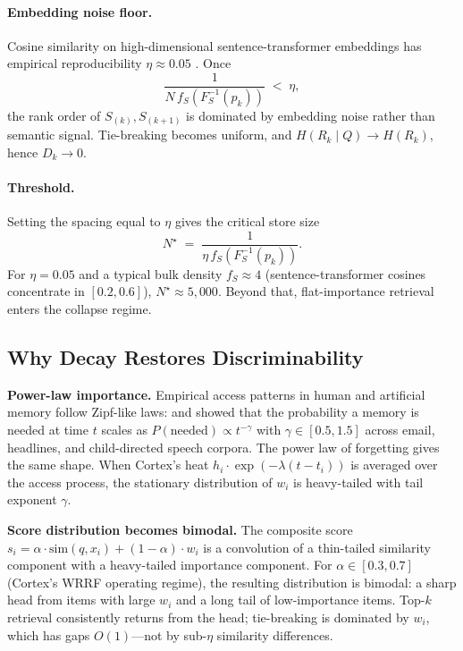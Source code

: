 \documentclass[11pt]{article}
\begin{document}
\paragraph{Embedding noise floor.}
Cosine similarity on high-dimensional sentence-transformer
embeddings has empirical reproducibility $\eta \approx 0.05$
\citep{Reimers2019}.  Once
\[
\frac{1}{N \, f_S(F_S^{-1}(p_k))} \;<\; \eta,
\]
the rank order of $S_{(k)}, S_{(k+1)}$ is dominated by embedding
noise rather than semantic signal.  Tie-breaking becomes uniform,
and $H(R_k \mid Q) \to H(R_k)$, hence $D_k \to 0$.

\paragraph{Threshold.}
Setting the spacing equal to $\eta$ gives the critical store size
\begin{equation}
N^\star \;=\; \frac{1}{\eta \, f_S(F_S^{-1}(p_k))}.
\label{eq:Nstar}
\end{equation}
For $\eta = 0.05$ and a typical bulk density $f_S \approx 4$
(sentence-transformer cosines concentrate in $[0.2, 0.6]$),
$N^\star \approx 5{,}000$.  Beyond that, flat-importance retrieval
enters the collapse regime.

\subsection{Why Decay Restores Discriminability}
\label{app:shannon-restore}

\textbf{Power-law importance.} Empirical access patterns in human
and artificial memory follow Zipf-like laws: \citet{Anderson1989}
and \citet{Anderson1991} showed that the probability a memory is
needed at time $t$ scales as
$P(\mathrm{needed}) \propto t^{-\gamma}$ with
$\gamma \in [0.5, 1.5]$ across email, headlines, and child-directed
speech corpora.  The power law of forgetting \citep{Wixted1991}
gives the same shape.  When Cortex's heat
$h_i \cdot \exp(-\lambda (t - t_i))$ is averaged over the access
process, the stationary distribution of $w_i$ is heavy-tailed with
tail exponent $\gamma$.

\textbf{Score distribution becomes bimodal.}  The composite score
$s_i = \alpha \cdot \mathrm{sim}(q, x_i) + (1 - \alpha) \cdot w_i$
is a convolution of a thin-tailed similarity component with a
heavy-tailed importance component.  For $\alpha \in [0.3, 0.7]$
(Cortex's WRRF operating regime), the resulting distribution is
bimodal: a sharp head from items with large $w_i$ and a long tail
of low-importance items.  Top-$k$ retrieval consistently returns
from the head; tie-breaking is dominated by $w_i$, which has gaps
$O(1)$---not by sub-$\eta$ similarity differences.
\end{document}
